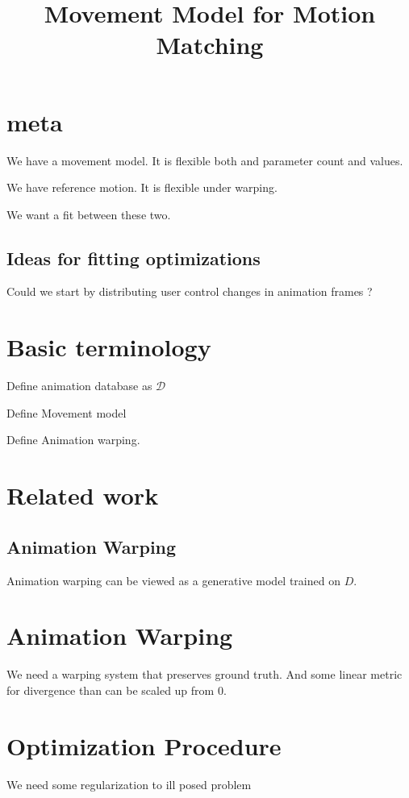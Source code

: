 \documentclass[format=acmtog]{acmart}
\begin{document}
\title{Movement Model for Motion Matching}

\maketitle

\section{meta}
We have a movement model. It is flexible both and parameter count and values.

We have reference motion. It is flexible under warping.

We want a fit between these two.

\subsection{Ideas for fitting optimizations}
Could we start by distributing user control changes in animation frames ?



\section{Basic terminology}
Define animation database as $\mathcal{D}$

Define Movement model

Define Animation warping.

\section{Related work}
\subsection{Animation Warping}
Animation warping can be viewed as a generative model trained on $D$. 




\section{Animation Warping}
We need a warping system that preserves ground truth. And some linear metric for divergence than can be scaled up from 0.


\section{Optimization Procedure}
We need some regularization to ill posed problem
\end{document}

